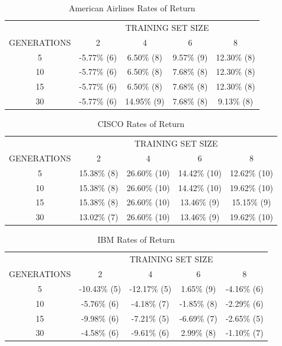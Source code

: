 \documentclass[a4paper,twoside]{article}
\begin{document}
\begin{table}
\caption{{American Airlines Rates of Return}}
\label{aa-ror-table}
    \begin{tabular}{ c c c c c }
         & \multicolumn{4}{c}{TRAINING SET SIZE} \\ 
        GENERATIONS & 2           & 4           & 6          & 8           \\ 
        5           & -5.77\% (6) & 6.50\% (8)  & 9.57\% (9) & 12.30\% (8) \\ 
        10          & -5.77\% (6) & 6.50\% (8)  & 7.68\% (8) & 12.30\% (8) \\ 
        15          & -5.77\% (6) & 6.50\% (8)  & 7.68\% (8) & 12.30\% (8) \\ 
        30          & -5.77\% (6) & 14.95\% (9) & 7.68\% (8) & 9.13\% (8)  \\ 
    \end{tabular} 
\end{table}
  
\begin{table}
\caption{{CISCO Rates of Return}}
\label{csco-ror-table}
    \begin{tabular}{ c c c c c }
         & \multicolumn{4}{c}{TRAINING SET SIZE} \\ 
        GENERATIONS & 2           & 4           & 6             & 8           \\ 
        5           & 15.38\% (8) & 26.60\% (10) & 14.42\% (10) & 12.62\% (10) \\ 
        10          & 15.38\% (8) & 26.60\% (10) & 14.42\% (10) & 19.62\% (10) \\ 
        15          & 15.38\% (8) & 26.60\% (10) & 13.46\% (9)  & 15.15\% (9) \\ 
        30          & 13.02\% (7) & 26.60\% (10) & 13.46\% (9)  & 19.62\% (10)  \\ 
    \end{tabular} 
\end{table}

\begin{table}
\caption{{IBM Rates of Return}}
\label{ibm-ror-table}
    \begin{tabular}{ c c c c c }
         & \multicolumn{4}{c}{TRAINING SET SIZE} \\ 
        GENERATIONS & 2            & 4           & 6             & 8           \\ 
        5           & -10.43\% (5) & -12.17\% (5) & 1.65\% (9) & -4.16\% (6) \\ 
        10          & -5.76\% (6)  & -4.18\% (7) & -1.85\% (8) & -2.29\% (6) \\ 
        15          & -9.98\% (6)  & -7.21\% (5) & -6.69\% (7)  & -2.65\% (5) \\ 
        30          & -4.58\% (6)  & -9.61\% (6) & 2.99\% (8)  & -1.10\% (7)  \\ 
    \end{tabular} 
\end{table}
\end{document}
